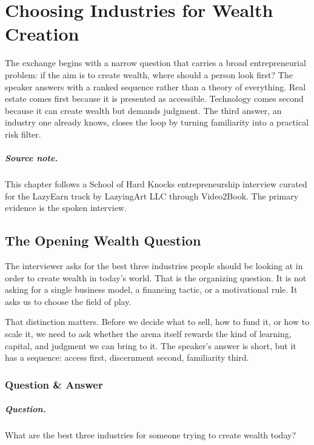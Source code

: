 \chapter{Choosing Industries for Wealth Creation}

The exchange begins with a narrow question that carries a broad entrepreneurial problem: if the aim is to create wealth, where should a person look first? The speaker answers with a ranked sequence rather than a theory of everything. Real estate comes first because it is presented as accessible. Technology comes second because it can create wealth but demands judgment. The third answer, an industry one already knows, closes the loop by turning familiarity into a practical risk filter.

\paragraph{Source note.}
This chapter follows a School of Hard Knocks entrepreneurship interview curated for the LazyEarn track by LazyingArt LLC through Video2Book. The primary evidence is the spoken interview.

\section{The Opening Wealth Question}

The interviewer asks for the best three industries people should be looking at in order to create wealth in today's world. That is the organizing question. It is not asking for a single business model, a financing tactic, or a motivational rule. It asks us to choose the field of play.

That distinction matters. Before we decide what to sell, how to fund it, or how to scale it, we need to ask whether the arena itself rewards the kind of learning, capital, and judgment we can bring to it. The speaker's answer is short, but it has a sequence: access first, discernment second, familiarity third.

\subsection{Question \& Answer}

\paragraph{Question.}
What are the best three industries for someone trying to create wealth today?

